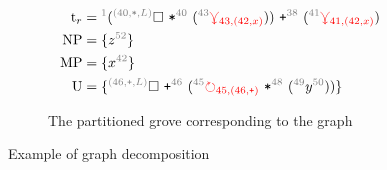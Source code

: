 {\begin{figure}
\begin{subfigure}{.5\textwidth}
    \begin{align*}
      \text{t}_r & = \eid{1}{}  (\emptyHole{(40,\texttt{*},L)}~\texttt{*}^{\id{40}}~(\eid{43}{}\multiVertex{43,(42,x)}))~\texttt{+}^{\id{38}}~(\eid{41}{}\multiVertex{41,(42,x)})\\
      \text{NP} & = \{ \eid{52}{z} \} \\
      \text{MP} & = \{ \eid{42}{x} \} \\
      \text{U} & = \{ \emptyHole{(46,\texttt{+},L)}~\texttt{+}^{\id{46}}~(\eid{45}{}\cycleVertex{45,(46,\texttt{+})}~\texttt{*}^{\id{48}}~(\eid{49}{}y^{\id{50}})) \}
    \end{align*}
    \caption{The partitioned grove corresponding to the graph}%
    \label{fig:Decomposition example partitioned grove}
  \end{subfigure}
  \caption{Example of graph decomposition}%
  \label{fig:Decomposition example}
\end{figure}
}
